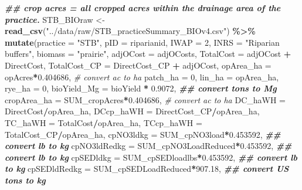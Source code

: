 \documentclass[
]{article}
\newenvironment{Shaded}{\begin{snugshade}}{\end{snugshade}}
\newcommand{\AttributeTok}[1]{\textcolor[rgb]{0.13,0.29,0.53}{#1}}
\newcommand{\CommentTok}[1]{\textcolor[rgb]{0.56,0.35,0.01}{\textit{#1}}}
\newcommand{\DecValTok}[1]{\textcolor[rgb]{0.00,0.00,0.81}{#1}}
\newcommand{\DocumentationTok}[1]{\textcolor[rgb]{0.56,0.35,0.01}{\textbf{\textit{#1}}}}
\newcommand{\FloatTok}[1]{\textcolor[rgb]{0.00,0.00,0.81}{#1}}
\newcommand{\FunctionTok}[1]{\textcolor[rgb]{0.13,0.29,0.53}{\textbf{#1}}}
\newcommand{\NormalTok}[1]{#1}
\newcommand{\OtherTok}[1]{\textcolor[rgb]{0.56,0.35,0.01}{#1}}
\newcommand{\SpecialCharTok}[1]{\textcolor[rgb]{0.81,0.36,0.00}{\textbf{#1}}}
\newcommand{\StringTok}[1]{\textcolor[rgb]{0.31,0.60,0.02}{#1}}
\begin{document}
\begin{Shaded}
\begin{Highlighting}[]
\DocumentationTok{\#\# crop acres = all cropped acres within the drainage area of the practice.}
\NormalTok{STB\_BIOraw }\OtherTok{\textless{}{-}} \FunctionTok{read\_csv}\NormalTok{(}\StringTok{"../data/raw/STB\_practiceSummary\_BIOv4.csv"}\NormalTok{) }\SpecialCharTok{\%\textgreater{}\%}
  \FunctionTok{mutate}\NormalTok{(}\AttributeTok{practice =} \StringTok{"STB"}\NormalTok{,}
         \AttributeTok{pID =}\NormalTok{ riparianid,}
         \AttributeTok{IWAP =} \DecValTok{2}\NormalTok{,}
         \AttributeTok{INRS =} \StringTok{"Riparian buffers"}\NormalTok{,}
         \AttributeTok{biomass =} \StringTok{"prairie"}\NormalTok{,}
         \AttributeTok{adjOCost =}\NormalTok{ adjOCosts,}
         \AttributeTok{TotalCost =}\NormalTok{ adjOCost }\SpecialCharTok{+}\NormalTok{ DirectCost,}
         \AttributeTok{TotalCost\_CP =}\NormalTok{ DirectCost\_CP }\SpecialCharTok{+}\NormalTok{ adjOCost,}
         \AttributeTok{opArea\_ha =}\NormalTok{ opAcres}\SpecialCharTok{*}\FloatTok{0.404686}\NormalTok{, }\CommentTok{\# convert ac to ha}
         \AttributeTok{patch\_ha =} \DecValTok{0}\NormalTok{,}
         \AttributeTok{lin\_ha =}\NormalTok{ opArea\_ha,}
         \AttributeTok{rye\_ha =} \DecValTok{0}\NormalTok{,}
         \AttributeTok{bioYield\_Mg =}\NormalTok{ bioYield }\SpecialCharTok{*} \FloatTok{0.9072}\NormalTok{, }\DocumentationTok{\#\# convert tons to Mg}
         \AttributeTok{cropArea\_ha =}\NormalTok{ SUM\_cropAcres}\SpecialCharTok{*}\FloatTok{0.404686}\NormalTok{, }\CommentTok{\# convert ac to ha}
         \AttributeTok{DC\_haWH =}\NormalTok{ DirectCost}\SpecialCharTok{/}\NormalTok{opArea\_ha,}
         \AttributeTok{DCcp\_haWH =}\NormalTok{ DirectCost\_CP}\SpecialCharTok{/}\NormalTok{opArea\_ha,}
         \AttributeTok{TC\_haWH =}\NormalTok{ TotalCost}\SpecialCharTok{/}\NormalTok{opArea\_ha,}
         \AttributeTok{TCcp\_haWH =}\NormalTok{ TotalCost\_CP}\SpecialCharTok{/}\NormalTok{opArea\_ha,}
         \AttributeTok{cpNO3ldkg =}\NormalTok{ SUM\_cpNO3load}\SpecialCharTok{*}\FloatTok{0.453592}\NormalTok{, }\DocumentationTok{\#\# convert lb to kg}
         \AttributeTok{cpNO3ldRedkg =}\NormalTok{ SUM\_cpNO3LoadReduced}\SpecialCharTok{*}\FloatTok{0.453592}\NormalTok{, }\DocumentationTok{\#\# convert lb to kg}
         \AttributeTok{cpSEDldkg =}\NormalTok{ SUM\_cpSEDloadlbs}\SpecialCharTok{*}\FloatTok{0.453592}\NormalTok{, }\DocumentationTok{\#\# convert lb to kg}
         \AttributeTok{cpSEDldRedkg =}\NormalTok{ SUM\_cpSEDLoadReduced}\SpecialCharTok{*}\FloatTok{907.18}\NormalTok{, }\DocumentationTok{\#\# convert US tons to kg}

\end{Highlighting}
\end{Shaded}
\end{document}
